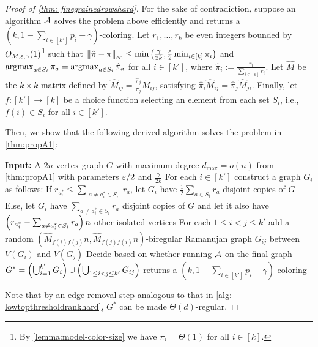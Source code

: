 \begin{proof}[Proof of \cref{thm: finegrainedrowshard}]
    For the sake of contradiction, suppose an algorithm $\mathcal{A}$ solves the problem above efficiently and returns a $(k, 1 - \sum_{i \in [k']} p_i - \gamma)$-coloring.
    Let $r_1, \ldots, r_k$ be even integers bounded by $O_{M, \varepsilon, \gamma}(1)$\footnote{By \cref{lemma:model-color-size} we have $\pi_i=\Theta(1)$ for all $i\in[k]$.} such that $\left\lVert\hat{\pi} - \pi\right\rVert_{\infty}\leq \min\left(\frac{\gamma}{2k}, \frac{\varepsilon}{2}\min_{i\in [k]}\pi_i\right)$ and $\operatorname*{\arg\!\max}_{a \in S_i} \pi_a=\operatorname*{\arg\!\max}_{a \in S_i} \hat{\pi}_a$ for all $i\in[k']$, where $\hat{\pi}_i:=\frac{r_i}{\sum_{i\in[k]} r_i}$.
    Let $\widehat{M}$ be the $k\times k$ matrix defined by $\widehat{M}_{ij}=\frac{\hat{\pi}_j}{\pi_j}M_{ij}$, satisfying $\hat{\pi}_i\widehat{M}_{ij}=\hat{\pi}_j\widehat{M}_{ji}$.
    Finally, let \( f : [k'] \to [k] \) be a choice function selecting an element from each set \( S_i \), i.e., \( f(i) \in S_i \) for all \( i \in [k'] \).
    
    Then, we show that the following derived algorithm solves the problem in \cref{thm:propA1}:

    \begin{algorithm}[H]
        \caption{Fine-grained model hardness algorithm}
        \label{alg: finegrainedrowshard}
        \DontPrintSemicolon
        \textbf{Input:} A $2n$-vertex graph $G$ with maximum degree $d_{\max} = o(n)$ from \cref{thm:propA1} with parameters $\varepsilon/2$ and $\frac{\gamma}{2k}$\;
        For each $i \in [k']$ construct a graph $G_i$ as follows:\;
        \quad If $r_{a_i^*} \leq \sum_{\substack{a \neq a_i^{*} \in S_i}} r_a$, let $G_i$ have $\frac{1}{2} \sum_{a \in S_i} r_a$ disjoint copies of $G$\;
        \quad Else, let $G_i$ have $\sum_{a \neq a_i^* \in S_i} r_a$ disjoint copies of $G$ and let it also have $\left(r_{a_i^*} - \sum_{a \neq a_i^* \in S_i} r_a\right)n$ other isolated vertices\;
        For each $1\leq i<j\leq k'$ add a random $(\widehat{M}_{f(i)f(j)}n, \widehat{M}_{f(j)f(i)}n)$-biregular Ramanujan graph $G_{ij}$ between $V(G_i)$ and $V(G_j)$\;
        Decide based on whether running $\mathcal{A}$ on the final graph $G^*=\left(\bigcup_{i=1}^{k'} G_i\right) \cup \left(\bigcup_{1 \leq i < j \leq k'} G_{ij}\right)$ returns a $(k, 1 - \sum_{i \in [k']} p_i - \gamma)$-coloring\;
    \end{algorithm}

    Note that by an edge removal step analogous to that in \cref{alg: lowtopthresholdrankhard}, $G^*$ can be made $\Theta(d)$-regular.


\end{proof}
